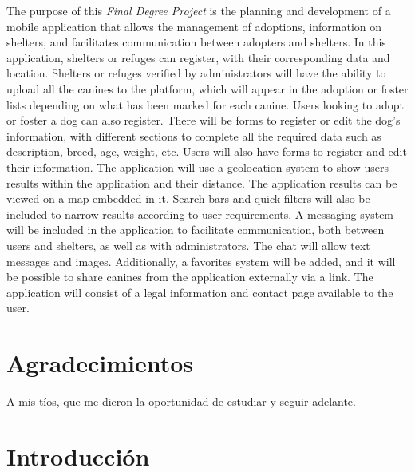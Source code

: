 \documentclass[a4paper, 12pt]{article}
\begin{document}
The purpose of this \textit{Final Degree Project} is the planning and development of a mobile application that allows the management of adoptions, information on shelters, and facilitates communication between adopters and shelters. In this application, shelters or refuges can register, with their corresponding data and location. Shelters or refuges verified by administrators will have the ability to upload all the canines to the platform, which will appear in the adoption or foster lists depending on what has been marked for each canine. Users looking to adopt or foster a dog can also register. There will be forms to register or edit the dog's information, with different sections to complete all the required data such as description, breed, age, weight, etc. Users will also have forms to register and edit their information. The application will use a geolocation system to show users results within the application and their distance. The application results can be viewed on a map embedded in it. Search bars and quick filters will also be included to narrow results according to user requirements. A messaging system will be included in the application to facilitate communication, both between users and shelters, as well as with administrators. The chat will allow text messages and images. Additionally, a favorites system will be added, and it will be possible to share canines from the application externally via a link. The application will consist of a legal information and contact page available to the user.

\newpage
\thispagestyle{empty}
\mbox{}

\newpage
\section*{Agradecimientos}
\begin{center} 
\vspace*{\fill}
A mis tíos, que me dieron la oportunidad de estudiar y seguir adelante.
\vspace*{\fill}
\end{center} 

\newpage
\thispagestyle{empty}
\mbox{}
\newpage
\thispagestyle{empty}
\mbox{}

\tableofcontents
\listoftables
\listoffigures

\newpage
\thispagestyle{empty}
\mbox{}

\newpage
\section{Introducción}
\end{document}
